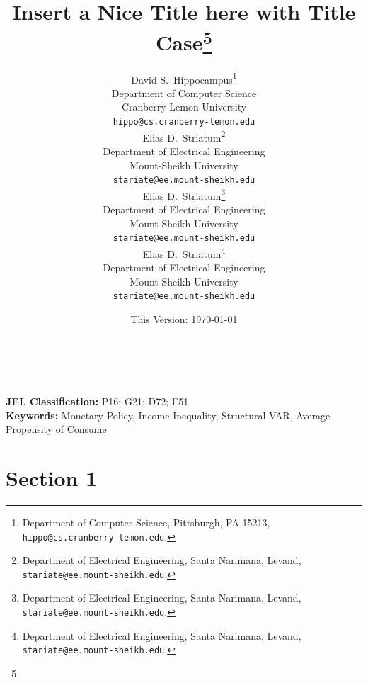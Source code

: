 \documentclass[11pt]{article}
\date{This Version: \today}
\title{Insert a Nice Title here with Title Case\thanks{\Acknowledgments}}
\author{
    {David S.~Hippocampus}\thanks{Department of Computer Science, Pittsburgh, PA 15213, \texttt{hippo@cs.cranberry-lemon.edu}.} \\
    Department of Computer Science\\
    Cranberry-Lemon University\\
    \texttt{hippo@cs.cranberry-lemon.edu} \\
    \And
    {Elias D.~Striatum}\thanks{Department of Electrical Engineering, Santa Narimana, Levand, \texttt{stariate@ee.mount-sheikh.edu}.} \\
    Department of Electrical Engineering\\
    Mount-Sheikh University\\
    \texttt{stariate@ee.mount-sheikh.edu} \\
    \AND
    {Elias D.~Striatum}\thanks{Department of Electrical Engineering, Santa Narimana, Levand, \texttt{stariate@ee.mount-sheikh.edu}.} \\
    Department of Electrical Engineering\\
    Mount-Sheikh University\\
    \texttt{stariate@ee.mount-sheikh.edu} \\
    \And
    {Elias D.~Striatum}\thanks{Department of Electrical Engineering, Santa Narimana, Levand, \texttt{stariate@ee.mount-sheikh.edu}.} \\
    Department of Electrical Engineering\\
    Mount-Sheikh University\\
    \texttt{stariate@ee.mount-sheikh.edu} \\
}
\begin{document}
\maketitle

\renewcommand{\thefootnote}{\arabic{footnote}}
\setcounter{footnote}{0}


\draftdisclaimer


\begin{abstract}
  \noindent \lipsum[10]\\
\end{abstract}

\vfill

{\noindent \textbf{JEL Classification:} P16; G21; D72; E51} \\
{\noindent \textbf{Keywords:} Monetary Policy, Income Inequality, Structural VAR, Average Propensity of Consume}\\

\newpage





\section{Section 1}
\end{document}
